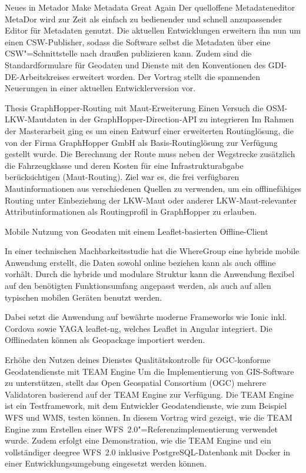 %
{Neues in Metador}%
{Make Metadata Great Again}%
{Der quelloffene Metadateneditor MetaDor wird zur Zeit als einfach zu bedienender und schnell
anzupassender Editor für Metadaten genutzt. Die aktuellen Entwicklungen erweitern ihn nun um einen
CSW-Publisher, sodass die Software selbst die Metadaten über eine CSW"=Schnittstelle nach draußen
publizieren kann. Zudem sind die Standardformulare für Geodaten und Dienste mit den
Konventionen des GDI-DE-Arbeitskreises erweitert worden. Der Vortrag stellt die spannenden
Neuerungen in einer aktuellen Entwicklerversion vor.}

%
{Thesis GraphHopper-Routing mit Maut-Erweiterung}%
{Einen Versuch die OSM-LKW-Mautdaten in der GraphHopper-Direction-API zu integrieren}%
{Im Rahmen der Masterarbeit ging es um einen Entwurf einer erweiterten
Routinglösung, die von der Firma GraphHopper GmbH als
Basis-Routinglösung zur Verfügung gestellt wurde. Die Berechnung der
Route muss neben der Wegstrecke zusätzlich die Fahrzeugklasse und deren
Kosten für eine Infrastrukturabgabe berücksichtigen (Maut-Routing).
Ziel war es, die frei verfügbaren Mautinformationen aus verschiedenen
Quellen zu verwenden, um ein offlinefähiges Routing unter Einbeziehung
der LKW-Maut oder anderer LKW-Maut-relevanter Attributinformationen als
Routingprofil in GraphHopper zu erlauben.}

%
{Mobile Nutzung von Geodaten mit \mbox{einem} Leaflet-basierten Offline-Client}%
{}%
{In einer technischen Machbarkeitsstudie hat die WhereGroup eine hybride mobile
Anwendung erstellt, die Daten sowohl online beziehen kann als auch offline
vorhält. Durch die hybride und modulare Struktur kann die Anwendung flexibel
auf den benötigten Funktionsumfang angepasst werden, als auch auf allen
typischen mobilen Geräten benutzt werden.

Dabei setzt die Anwendung auf
bewährte moderne Frameworks wie Ionic inkl. Cordova sowie YAGA leaflet-ng,
welches Leaflet in Angular integriert. Die Offlinedaten können als Geopackage
importiert werden.}

%
{Erhöhe den Nutzen deines Dienstes}%
{Qualitätskontrolle für OGC-konforme Geodatendienste mit TEAM Engine}%
{Um die Implementierung von GIS-Software zu unterstützen, stellt das Open Geospatial Consortium
(OGC) mehrere Validatoren basierend auf der TEAM Engine zur Verfügung. Die TEAM Engine ist ein
Testframework, mit dem Entwickler Geodatendienste, wie zum Beispiel WFS und WMS, testen können.  In
diesem Vortrag wird gezeigt, wie die TEAM Engine zum Erstellen einer WFS~2.0"=Referenzimplementierung
verwendet wurde. Zudem erfolgt eine Demonstration, wie die TEAM Engine und ein vollständiger deegree
WFS~2.0 inklusive PostgreSQL-Datenbank mit Docker in einer Entwicklungsumgebung eingesetzt werden
können.}

